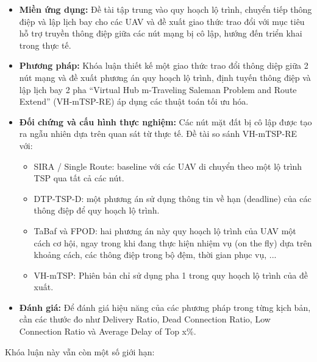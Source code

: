 \documentclass[a4paper]{article}
\begin{document}
\begin{itemize}
  \item {\bfseries Miền ứng dụng:} Đề tài tập trung vào quy hoạch lộ trình, chuyển tiếp thông điệp và lập lịch bay cho các UAV và đề xuất giao thức trao đổi với mục tiêu hỗ trợ truyền thông điệp giữa các nút mạng bị cô lập, hướng đến triển khai trong thực tế.
  \item {\bfseries Phương pháp:} Khóa luận thiết kế một giao thức trao đổi thông diệp giữa 2 nút mạng và đề xuất phương án quy hoạch lộ trình, định tuyến thông điệp và lập lịch bay 2 pha ``Virtual Hub m-Traveling Saleman Problem and Route Extend'' (VH-mTSP-RE) áp dụng các thuật toán tối ưu hóa.
  \item {\bfseries Đối chứng và cấu hình thực nghiệm:} Các nút mặt đất bị cô lập được tạo ra ngẫu nhiên dựa trên quan sát từ thực tế. Đề tài so sánh VH-mTSP-RE với:
  \begin{itemize}
    \item SIRA / Single Route: baseline với các UAV di chuyển theo một lộ trình TSP qua tất cả các nút.
    \item DTP-TSP-D: một phương án sử dụng thông tin về hạn (deadline) của các thông điệp để quy hoạch lộ trình.
    \item TaBaf và FPOD: hai phương án này quy hoạch lộ trình của UAV một cách cơ hội, ngay trong khi đang thực hiện nhiệm vụ (on the fly) dựa trên khoảng cách, các thông điệp trong bộ đệm, thời gian phục vụ, ...
    \item VH-mTSP: Phiên bản chỉ sử dụng pha 1 trong quy hoạch lộ trình của đề xuất.
  \end{itemize}
  \item {\bfseries Đánh giá:} Để đánh giá hiệu năng của các phương pháp trong từng kịch bản, cần các thước đo như Delivery Ratio, Dead Connection Ratio, Low Connection Ratio và Average Delay of Top x\%.

\end{itemize}
Khóa luận này vẫn còn một số giới hạn:
\end{document}
